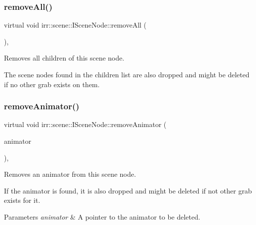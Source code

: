 \subsubsection{\texorpdfstring{remove\+All()}{removeAll()}\hspace{0.1cm}{\footnotesize\ttfamily [2/2]}}
{\footnotesize\ttfamily virtual void irr\+::scene\+::\+I\+Scene\+Node\+::remove\+All (\begin{DoxyParamCaption}{ }\end{DoxyParamCaption})\hspace{0.3cm}{\ttfamily [inline]}, {\ttfamily [virtual]}}



Removes all children of this scene node. 

The scene nodes found in the children list are also dropped and might be deleted if no other grab exists on them. \mbox{\label{classirr_1_1scene_1_1ISceneNode_aaa67f8f91d4ec99f82955641f1f9e521}} 
\subsubsection{\texorpdfstring{remove\+Animator()}{removeAnimator()}\hspace{0.1cm}{\footnotesize\ttfamily [1/2]}}
{\footnotesize\ttfamily virtual void irr\+::scene\+::\+I\+Scene\+Node\+::remove\+Animator (\begin{DoxyParamCaption}\item[{\hyperlink{classirr_1_1scene_1_1ISceneNodeAnimator}{I\+Scene\+Node\+Animator} $\ast$}]{animator }\end{DoxyParamCaption})\hspace{0.3cm}{\ttfamily [inline]}, {\ttfamily [virtual]}}



Removes an animator from this scene node. 

If the animator is found, it is also dropped and might be deleted if not other grab exists for it. 
\begin{DoxyParams}{Parameters}
{\em animator} & A pointer to the animator to be deleted. \\
\hline
\end{DoxyParams}
\mbox{\label{classirr_1_1scene_1_1ISceneNode_aaa67f8f91d4ec99f82955641f1f9e521}} 
